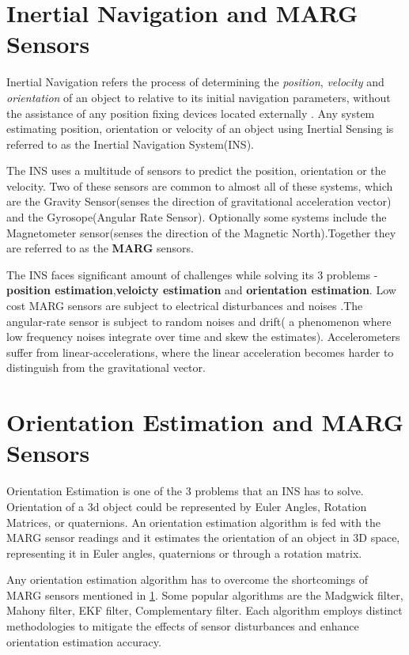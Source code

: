 \documentclass{iutbscthesis}
\begin{document}
\section{Inertial Navigation and MARG Sensors} \label{introINSMARG}
Inertial Navigation refers the process of determining the \textit{position}, \textit{velocity} and \textit{orientation} of an object to relative to its initial navigation parameters, without the assistance of any position fixing devices located externally \cite{el2020inertial}. Any system estimating position, orientation or velocity of an object using Inertial Sensing is referred to as the Inertial Navigation System(INS). 
\par
The INS uses a multitude of sensors to predict the position, orientation or the velocity. Two of these sensors are common to almost all of these systems, which are the Gravity Sensor(senses the direction of gravitational acceleration vector) and the Gyrosope(Angular Rate Sensor). Optionally some systems include the Magnetometer sensor(senses the direction of the Magnetic North)\cite{nawrat2012inertial}.Together they are referred to as the \textbf{MARG} sensors.
\par
The INS faces significant amount of challenges while solving its 3 problems - \textbf{position estimation},\textbf{veloicty estimation} and \textbf{orientation estimation}. Low cost MARG sensors are subject to electrical disturbances and noises \cite{guo2017novel}\cite{hu2014robust}.The angular-rate sensor is subject to random noises and drift( a phenomenon where low frequency noises integrate over time and skew the estimates)\cite{guo2017novel}. Accelerometers suffer from linear-accelerations, where the linear acceleration becomes harder to distinguish from the gravitational vector\cite{hu2014robust}.

\section{Orientation Estimation and MARG Sensors}
Orientation Estimation is one of the 3 problems that an INS has to solve. 
Orientation of a 3d object could be represented by Euler Angles, 
Rotation Matrices, or quaternions\cite{attitudeREpresntation}. An 
orientation estimation algorithm is fed with the MARG sensor readings 
and it estimates the orientation of an object in 3D space, representing 
it in Euler angles, quaternions or through a rotation matrix.
\par
Any orientation estimation algorithm has to overcome the shortcomings of MARG 
sensors mentioned in \ref{introINSMARG}. Some popular algorithms are the Madgwick 
filter\cite{madgwick2011estimation}, Mahony filter\cite{mahony2008nonlinear}, EKF 
filter\cite{EKF}, Complementary filter\cite{compfilter}. Each algorithm employs 
distinct methodologies to mitigate the effects of sensor disturbances and enhance 
orientation estimation accuracy.
\end{document}
